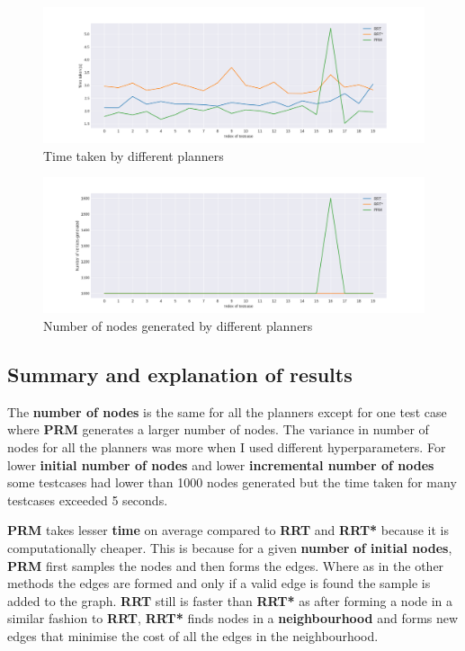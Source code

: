 \documentclass[11pt]{article}
\begin{document}
\begin{figure}[H]
    \centering
    \includegraphics[width=\linewidth]{plot2_1000.png}
    \caption*{Time taken by different planners}
\end{figure}
\vspace*{-8mm}
\begin{figure}[H]
    \centering
    \includegraphics[width=\linewidth]{plot3_1000.png}
    \caption*{Number of nodes generated by different planners}
\end{figure}
\subsection{Summary and explanation of results}
The \textbf{number of nodes} is the same for all the planners except for one test case where \textbf{PRM}
generates a larger number of nodes. The variance in number of nodes for all the planners was more
when I used different hyperparameters. For lower \textbf{initial number of nodes} and lower \textbf{incremental number of nodes}
some testcases had lower than 1000 nodes generated but the time taken for many testcases exceeded 5 seconds. 

\noindent
\textbf{PRM} takes lesser \textbf{time} on average compared to \textbf{RRT} and \textbf{RRT*} because it is computationally cheaper. 
This is because for a given \textbf{number of initial nodes}, \textbf{PRM} first samples the nodes and then forms the edges. Where as in the other methods
the edges are formed and only if a valid edge is found the sample is added to the graph. \textbf{RRT} still is faster than \textbf{RRT*} as after forming a 
node in a similar fashion to \textbf{RRT}, \textbf{RRT*} finds nodes in a \textbf{neighbourhood} and forms new edges that minimise the cost of all the edges in the neighbourhood. 
\end{document}

